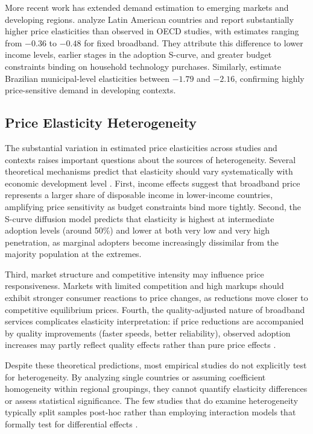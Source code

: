 \documentclass[12pt,review]{elsarticle}
\begin{document}
More recent work has extended demand estimation to emerging markets and developing regions. \citet{galperin2017price} analyze Latin American countries and report substantially higher price elasticities than observed in OECD studies, with estimates ranging from $-0.36$ to $-0.48$ for fixed broadband. They attribute this difference to lower income levels, earlier stages in the adoption S-curve, and greater budget constraints binding on household technology purchases. Similarly, \citet{macedo2011elasticity} estimate Brazilian municipal-level elasticities between $-1.79$ and $-2.16$, confirming highly price-sensitive demand in developing contexts.

\subsection{Price Elasticity Heterogeneity}

The substantial variation in estimated price elasticities across studies and contexts raises important questions about the sources of heterogeneity. Several theoretical mechanisms predict that elasticity should vary systematically with economic development level \citep{hauge2010demand}. First, income effects suggest that broadband price represents a larger share of disposable income in lower-income countries, amplifying price sensitivity as budget constraints bind more tightly. Second, the S-curve diffusion model predicts that elasticity is highest at intermediate adoption levels (around 50\%) and lower at both very low and very high penetration, as marginal adopters become increasingly dissimilar from the majority population at the extremes.

Third, market structure and competitive intensity may influence price responsiveness. Markets with limited competition and high markups should exhibit stronger consumer reactions to price changes, as reductions move closer to competitive equilibrium prices. Fourth, the quality-adjusted nature of broadband services complicates elasticity interpretation: if price reductions are accompanied by quality improvements (faster speeds, better reliability), observed adoption increases may partly reflect quality effects rather than pure price effects \citep{hauge2010demand}.

Despite these theoretical predictions, most empirical studies do not explicitly test for heterogeneity. By analyzing single countries or assuming coefficient homogeneity within regional groupings, they cannot quantify elasticity differences or assess statistical significance. The few studies that do examine heterogeneity typically split samples post-hoc rather than employing interaction models that formally test for differential effects \citep{roller1996telecommunications}.
\end{document}
